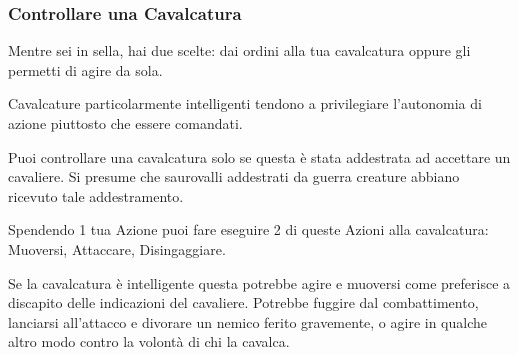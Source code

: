 \begin{multicols}{2}
\subsubsection{Controllare una Cavalcatura}\label{controllocavalcatura}

Mentre sei in sella, hai due scelte: dai ordini alla tua cavalcatura oppure gli permetti di agire da sola.

Cavalcature particolarmente intelligenti tendono a privilegiare l'autonomia di azione piuttosto che essere comandati.

Puoi controllare una cavalcatura solo se questa è stata addestrata ad accettare un cavaliere. Si presume che saurovalli addestrati da guerra creature abbiano ricevuto tale addestramento.

Spendendo 1 tua Azione puoi fare eseguire 2 di queste Azioni alla cavalcatura: Muoversi, Attaccare, Disingaggiare.

Se la cavalcatura è intelligente questa potrebbe agire e muoversi come preferisce a discapito delle indicazioni del cavaliere. Potrebbe fuggire dal combattimento, lanciarsi all'attacco e divorare un nemico ferito gravemente, o agire in qualche altro modo contro la volontà di chi la cavalca.

\end{multicols}

\vfill

